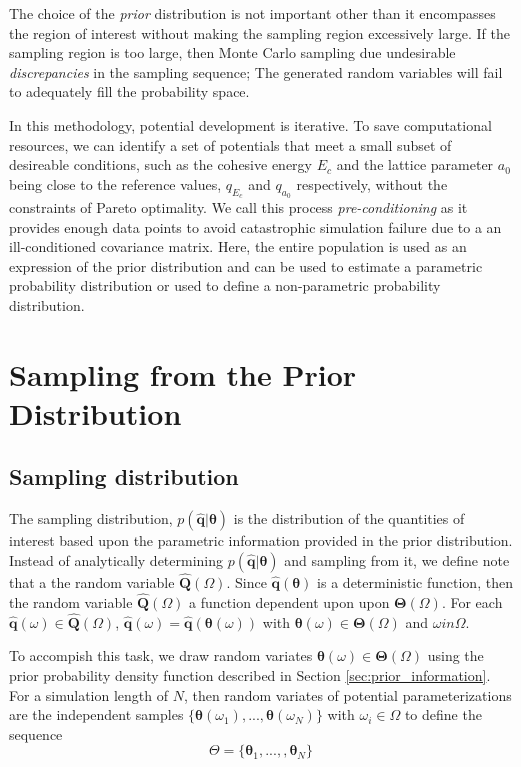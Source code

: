 The choice of the \emph{prior} distribution is not important other than it encompasses the region of interest without making the sampling region excessively large.  If the sampling region is too large, then Monte Carlo sampling due undesirable \emph{discrepancies} in the sampling sequence; The generated random variables will fail to adequately fill the probability space.

In this methodology, potential development is iterative.  To save computational resources, we can identify a set of potentials that meet a small subset of desireable conditions, such as the cohesive energy $E_c$ and the lattice parameter $a_0$ being close to the reference values, $q_{E_c}$ and $q_{a_0}$ respectively, without the constraints of Pareto optimality.  We call this process \emph{pre-conditioning} as it provides enough data points to avoid catastrophic simulation failure due to a an ill-conditioned covariance matrix.  Here, the entire population is used as an expression of the prior distribution and can be used to estimate a parametric probability distribution or used to define a non-parametric probability distribution.

\section{Sampling from the Prior Distribution}
\label{sec:sampling}

\subsection{Sampling distribution}

The sampling distribution, $p(\hat{\bm{q}}|\bm{\theta})$  is the distribution of the quantities of interest based upon the parametric information provided in the prior distribution.  Instead of analytically determining $p(\hat{\bm{q}}|\bm{\theta})$ and sampling from it, we define note that a the random variable $\hat{\bm{Q}}(\Omega)$.  Since $\hat{\bm{q}}(\bm{\theta})$ is a deterministic function, then the random variable $\hat{\bm{Q}}(\Omega)$ a function dependent upon upon $\bm{\Theta}(\Omega)$.
For each $\hat{\bm{q}}(\omega) \in \hat{\bm{Q}}(\Omega)$, $\hat{\bm{q}}(\omega) = \hat{\bm{q}}(\bm{\theta}(\omega))$ with $\bm{\theta}(\omega) \in \bm{\Theta}(\Omega)$ and $\omega in \Omega$.

To accompish this task, we draw random variates  $\bm{\theta}(\omega) \in \bm{\Theta}(\Omega)$ using the prior probability density function described in Section \ref{sec:prior_information}.  For a simulation length of $N$, then random variates of potential parameterizations are the independent samples $\{\bm{\theta}(\omega_1),...,\bm{\theta}(\omega_N)\}$ with $\omega_i \in \Omega$ to define the sequence
\begin{equation}
\label{eq:theta_seq}
	  \Theta = \{\bm{\theta}_1,...,,\bm{\theta}_N\}
\end{equation}

